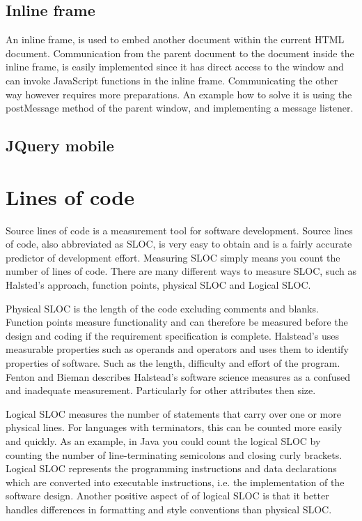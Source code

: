 \subsection{Inline frame}
An inline frame, is used to embed another document within the current HTML document. Communication from the parent document to the document inside the inline frame, is easily implemented since it has direct access to the window and can invoke JavaScript functions in the inline frame. Communicating the other way however requires more preparations. An example how to solve it is using the postMessage method of the parent window, and implementing a message listener.

\subsection{JQuery mobile}

\section{Lines of code}\label{section-lines-of-code}
Source lines of code is a measurement tool for software development. Source lines of code, also abbreviated as SLOC, is very easy to obtain and is a fairly accurate predictor of development effort\cite[p.~63]{galorath2006}. Measuring SLOC simply means you count the number of lines of code. There are many different ways to measure SLOC, such as Halsted’s approach, function points, physical SLOC and Logical SLOC. 

Physical SLOC is the length of the code excluding comments and blanks. Function points measure functionality and can therefore be measured before the design and coding if the requirement specification is complete\cite[p.~187]{galorath2006}. Halstead’s uses measurable properties such as operands and operators and uses them to identify properties of software. Such as the length, difficulty and effort of the program. Fenton and Bieman describes Halstead’s software science measures as a confused and inadequate measurement. Particularly for other attributes then size\cite[p.~345]{fenton2015}.

Logical SLOC measures the number of statements that carry over one or more physical lines.  For languages with terminators, this can be counted more easily and quickly. As an example, in Java you could count the logical SLOC by counting the number of line-terminating semicolons and closing curly brackets. Logical SLOC represents the programming instructions and data declarations which are converted into executable instructions, i.e. the implementation of the software design. Another positive aspect of of logical SLOC is that it better handles differences in formatting and style conventions than physical SLOC\cite[p.~155]{galorath2006}.

